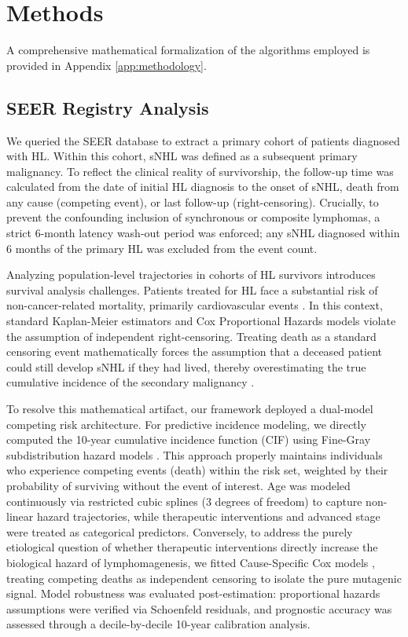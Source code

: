 \documentclass[a4paper,11pt,twocolumn]{article}
\begin{document}
	\section{Methods}
	
	A comprehensive mathematical formalization of the algorithms employed is provided in Appendix \ref{app:methodology}.
	
	\subsection{SEER Registry Analysis}
	We queried the SEER database to extract a primary cohort of patients diagnosed with HL. Within this cohort, sNHL was defined as a subsequent primary malignancy. To reflect the clinical reality of survivorship, the follow-up time was calculated from the date of initial HL diagnosis to the onset of sNHL, death from any cause (competing event), or last follow-up (right-censoring). Crucially, to prevent the confounding inclusion of synchronous or composite lymphomas, a strict 6-month latency wash-out period was enforced; any sNHL diagnosed within 6 months of the primary HL was excluded from the event count.
	
	Analyzing population-level trajectories in cohorts of HL survivors introduces survival analysis challenges. Patients treated for HL face a substantial risk of non-cancer-related mortality, primarily cardiovascular events \cite{Aleman2003}. In this context, standard Kaplan-Meier estimators and Cox Proportional Hazards models violate the assumption of independent right-censoring. Treating death as a standard censoring event mathematically forces the assumption that a deceased patient could still develop sNHL if they had lived, thereby overestimating the true cumulative incidence of the secondary malignancy \cite{Austin2016}.
	
	To resolve this mathematical artifact, our framework deployed a dual-model competing risk architecture. For predictive incidence modeling, we directly computed the 10-year cumulative incidence function (CIF) using Fine-Gray subdistribution hazard models \cite{Fine1999}. This approach properly maintains individuals who experience competing events (death) within the risk set, weighted by their probability of surviving without the event of interest. Age was modeled continuously via restricted cubic splines (3 degrees of freedom) to capture non-linear hazard trajectories, while therapeutic interventions and advanced stage were treated as categorical predictors. Conversely, to address the purely etiological question of whether therapeutic interventions directly increase the biological hazard of lymphomagenesis, we fitted Cause-Specific Cox models \cite{Andersen2012}, treating competing deaths as independent censoring to isolate the pure mutagenic signal. Model robustness was evaluated post-estimation: proportional hazards assumptions were verified via Schoenfeld residuals, and prognostic accuracy was assessed through a decile-by-decile 10-year calibration analysis.
	
\end{document}
